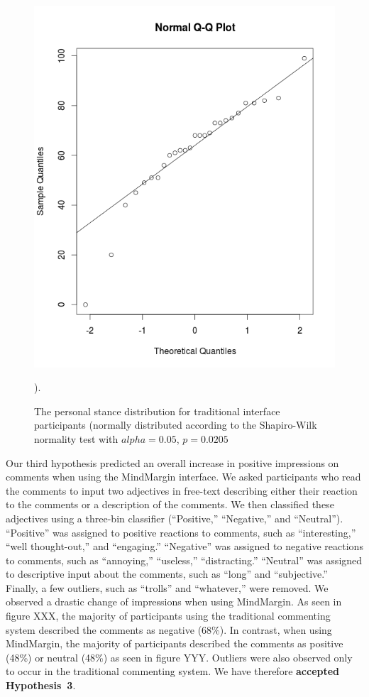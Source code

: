 \begin{figure}
\centering
\includegraphics[scale=0.25]{regular_normal.png}
\caption{The personal stance distribution for traditional interface participants (normally distributed according to the Shapiro-Wilk normality test with $alpha=0.05$, $p=0.0205$}).
\label{fig:mm_normal}
\end{figure}

Our third hypothesis predicted an overall increase in positive impressions on comments when using the MindMargin interface. We asked participants who read the comments to input two adjectives in free-text describing either their reaction to the comments or a description of the comments. We then classified these adjectives using a three-bin classifier (“Positive,” “Negative,” and “Neutral”). “Positive” was assigned to positive reactions to comments, such as “interesting,” “well thought-out,” and “engaging.” “Negative” was assigned to negative reactions to comments, such as “annoying,” “useless,” “distracting.” “Neutral” was assigned to descriptive input about the comments, such as “long” and “subjective.” Finally, a few outliers, such as “trolls” and “whatever,” were removed. We observed a drastic change of impressions when using MindMargin. As seen in figure XXX, the majority of participants using the traditional commenting system described the comments as negative (68\%). In contrast, when using MindMargin, the majority of participants described the comments as positive (48\%) or neutral (48\%) as seen in figure YYY.  Outliers were also observed only to occur in the traditional commenting system. We have therefore \textbf{accepted Hypothesis~3}. 

